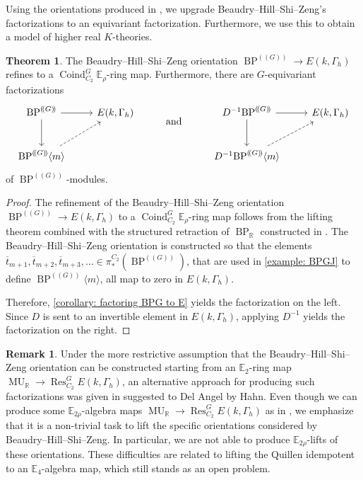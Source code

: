 \documentclass[a4paper, 10pt]{article}
\newcommand{\E}{\mathbb E}  %
\newcommand{\MU}{\operatorname{MU}}
\newcommand{\MUR}{{\MU_{\mathbb{R}}}}
\newcommand{\BPG}{{\BP^{(\!(G)\!)}}}
\newcommand{\BPGm}{{\BP^{(\!(G)\!)}}\langle m\rangle}
\newcommand{\BP}{\operatorname{BP}}
\newcommand{\BPR}{{\BP_{\mathbb{R}}}}
\newcommand{\Res}{\operatorname{Res}}
\newcommand{\Coind}{\operatorname{Coind}}
\theoremstyle{definition}
\newtheorem{remark}[remark]{Remark}
\newtheorem{theorem}[theorem]{Theorem}
\begin{document}
Using the orientations produced in \cite{quinnZhu2026multiplicativeequivariantthomspectra}, we upgrade Beaudry--Hill--Shi--Zeng's factorizations to an equivariant factorization. Furthermore, we use this to obtain a model of higher real $K$-theories.

\begin{theorem}\label{thm:BHSZ_refinement}
    The Beaudry--Hill--Shi--Zeng orientation \(\BPG \to E(k,\Gamma_h)\) refines to a \(\Coind^G_{C_2}\E_\rho\)-ring map.
    Furthermore, there are \(G\)-equivariant factorizations
    \[
    \begin{tikzcd}
        \BPG \ar[r]\ar[d] & E(k,\Gamma_h)
        &
        \raisebox{-0.9em}{\text{and}}
        &
        D^{-1}\BPG \ar[r]\ar[d] & E(k,\Gamma_h) \\
        \BPGm \ar[ru, dashed]
        &&
        &
        D^{-1}\BPGm \ar[ru, dashed]
    \end{tikzcd}
    \]
    of $\BPG$-modules.
\end{theorem}
\begin{proof}
    The refinement of the Beaudry--Hill--Shi--Zeng orientation \(\BPG\to E(k,\Gamma_h)\) to a \(\Coind^G_{C_2}\E_\rho\)-ring map follows from the lifting theorem \cite[Corollary 6.1.6]{quinnZhu2026multiplicativeequivariantthomspectra} combined with the structured retraction of $\BPR$ constructed in \cite[Theorem 6.3.3]{quinnZhu2026multiplicativeequivariantthomspectra}. 
    The Beaudry--Hill--Shi--Zeng orientation is constructed so that the elements \(\overline{t}_{m+1},\overline{t}_{m+2},\overline{t}_{m+3},\ldots\in \pi^{C_2}_*(\BPG)\), that are used in \cref{example: BPGJ} to define \(\BPGm\), all map to zero in \(E(k,\Gamma_h)\).

    Therefore, \cref{corollary: factoring BPG to E} yields the factorization on the left. Since $D$ is sent to an invertible element in $E(k,\Gamma_h)$, applying $D^{-1}$ yields the factorization on the right. 
\end{proof}

\begin{remark}
    Under the more restrictive assumption that the Beaudry--Hill--Shi--Zeng orientation can be constructed starting from an \(\E_2\)-ring map \(\MUR \to \Res^{G}_{C_2}E(k,\Gamma_h)\), an alternative approach for producing such factorizations was given in \cite[Proposition 3.2.6]{delangel2024dualshigherrealktheories} suggested to Del Angel by Hahn. Even though we can produce some $\E_{2\rho}$-algebra maps $\MUR \to \Res_{C_2}^G E(k, \Gamma_h)$ as in \cite[Example 2.21]{quinnZhu20206realsnaith}, we emphasize that it is a non-trivial task to lift the specific orientations considered by Beaudry--Hill--Shi--Zeng. In particular, we are not able to produce $\E_{2\rho}$-lifts of these orientations. These difficulties are related to lifting the Quillen idempotent to an $\E_4$-algebra map, which still stands as an open problem.
\end{remark}
\end{document}
